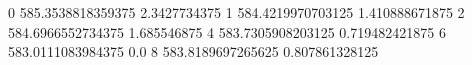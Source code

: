 0 585.3538818359375 2.3427734375
1 584.4219970703125 1.410888671875
2 584.6966552734375 1.685546875
4 583.7305908203125 0.719482421875
6 583.0111083984375 0.0
8 583.8189697265625 0.807861328125
